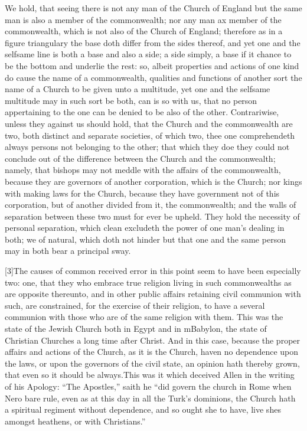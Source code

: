We hold, that seeing there is not any man of the Church of England but the same man is also a member of the commonwealth; nor any man ax member of the commonwealth, which is not also of the Church of England; therefore as in a figure triangulary the base doth differ from the sides thereof, and yet one and the selfsame line is both a base and also a side; a side simply, a base if it chance to be the bottom and underlie the rest: so, albeit properties and actions of one kind do cause the name of a commonwealth, qualities and functions of another sort the name of a Church to be given unto a multitude, yet one and the selfsame multitude may in such sort be both, can is so with us, that no person appertaining to the one can be denied to be also of the other. Contrariwise, unless they against us should hold, that the Church and the commonwealth are two, both distinct and separate societies, of which two, thee one comprehendeth always persons not belonging to the other; that which they doe they could not conclude out of the difference between the Church and the commonwealth; namely, that bishops may not meddle with the affairs of the commonwealth, because they are governors of another corporation, which is the Church; nor kings with making laws for the Church, because they have government not of this corporation, but of another divided from it, the commonwealth; and the walls of separation between these two must for ever be upheld. They hold the necessity of personal separation, which clean excludeth the power of one man’s dealing in both; we of natural, which doth not hinder but that one and the same person may in both bear a principal sway.


[3]The causes of common received error in this point seem to have been especially two: one, that they who embrace true religion living in such commonwealths as are opposite thereunto, and in other public affairs retaining civil communion with such, are constrained, for the exercise of their religion, to have a several communion with those who are of the same religion with them. This was the state of the Jewish Church both in Egypt and in mBabylon, the state of Christian Churches a long time after Christ. And in this case, because the proper affairs and actions of the Church, as it is the Church, haven no dependence upon the laws, or upon the governors of the civil state, an opinion hath thereby grown, that even so it should be always.This was it which deceived Allen in the writing of his Apology: “The Apostles,” saith he “did govern the church in Rome when  Nero bare rule, even as at this day in all the Turk’s dominions, the Church hath a spiritual regiment without dependence, and so ought she to have, live shes amongst heathens, or with Christians.”

